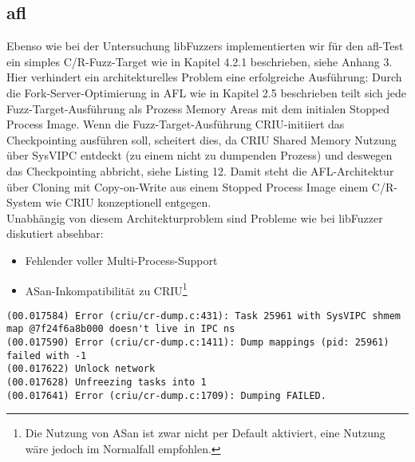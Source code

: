 \documentclass[a4paper]{article}
\begin{document}
\subsection{afl}
Ebenso wie bei der Untersuchung libFuzzers implementierten wir für den afl-Test ein simples C/R-Fuzz-Target wie in Kapitel 4.2.1 beschrieben, siehe Anhang 3.\\
Hier verhindert ein architekturelles Problem eine erfolgreiche Ausführung:
Durch die Fork-Server-Optimierung in AFL wie in Kapitel 2.5 beschrieben teilt sich jede Fuzz-Target-Ausführung als Prozess Memory Areas mit dem initialen Stopped Process Image. 
Wenn die Fuzz-Target-Ausführung CRIU-initiiert das Checkpointing ausführen soll, scheitert dies, da CRIU Shared Memory Nutzung über SysVIPC entdeckt (zu einem nicht zu dumpenden Prozess) und deswegen das Checkpointing abbricht, siehe Listing 12.
Damit steht die AFL-Architektur über Cloning mit Copy-on-Write aus einem Stopped Process Image einem C/R-System wie CRIU konzeptionell entgegen.\\
Unabhängig von diesem Architekturproblem sind Probleme wie bei libFuzzer diskutiert absehbar:
\begin{itemize}
    \item Fehlender voller Multi-Process-Support
    \item ASan-Inkompatibilität zu CRIU\footnote{Die Nutzung von ASan ist zwar nicht per Default aktiviert, eine Nutzung wäre jedoch im Normalfall empfohlen.}
\end{itemize}
\newpage
\begin{lstlisting}[caption=Checkpointing Error durch Shared Memory,]
(00.017584) Error (criu/cr-dump.c:431): Task 25961 with SysVIPC shmem map @7f24f6a8b000 doesn't live in IPC ns
(00.017590) Error (criu/cr-dump.c:1411): Dump mappings (pid: 25961) failed with -1
(00.017622) Unlock network
(00.017628) Unfreezing tasks into 1
(00.017641) Error (criu/cr-dump.c:1709): Dumping FAILED.
\end{lstlisting}
\end{document}
